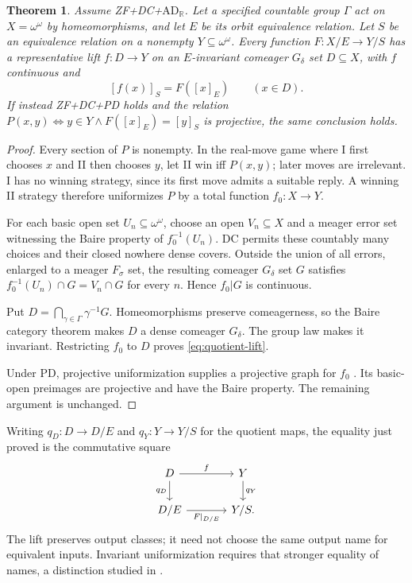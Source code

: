 \documentclass[11pt]{article}
\newtheorem{theorem}{Theorem}[section]
\theoremstyle{definition}
\newcommand{\B}{\omega^\omega}
\begin{document}
\begin{theorem}\label{thm:generic-lift}
Assume ZF+DC+$\mathrm{AD}_{\mathbb R}$. Let a specified countable
group $\Gamma$ act on $X=\B$ by homeomorphisms, and let $E$ be
its orbit equivalence relation. Let $S$ be an equivalence relation
on a nonempty $Y\subseteq\B$. Every function
$F:X/E\to Y/S$ has a representative lift
$f:D\to Y$ on an $E$-invariant comeager $G_\delta$ set
$D\subseteq X$, with $f$ continuous and
\begin{equation}\label{eq:quotient-lift}
 [f(x)]_S=F([x]_E)\qquad(x\in D).
\end{equation}
If instead ZF+DC+PD holds and the relation
$P(x,y)\iff y\in Y\land F([x]_E)=[y]_S$ is projective,
the same conclusion holds.
\end{theorem}
\begin{proof}
Every section of $P$ is nonempty. In the real-move game where I
first chooses $x$ and II then chooses $y$, let II win iff $P(x,y)$;
later moves are irrelevant. I has no winning strategy, since its
first move admits a suitable reply. A winning II strategy therefore
uniformizes $P$ by a total function $f_0:X\to Y$.

For each basic open set $U_n\subseteq\B$, choose an open
$V_n\subseteq X$ and a meager error set witnessing the Baire
property of $f_0^{-1}(U_n)$. DC permits these countably many
choices and their closed nowhere dense covers. Outside the union
of all errors, enlarged to a meager $F_\sigma$ set, the resulting
comeager $G_\delta$ set $G$ satisfies
$f_0^{-1}(U_n)\cap G=V_n\cap G$ for every $n$.
Hence $f_0|G$ is continuous.

Put $D=\bigcap_{\gamma\in\Gamma}\gamma^{-1}G$.
Homeomorphisms preserve comeagerness, so the Baire category theorem
makes $D$ a dense comeager $G_\delta$. The group law makes it
invariant. Restricting $f_0$ to $D$ proves \eqref{eq:quotient-lift}.

Under PD, projective uniformization supplies a projective graph for
$f_0$ \cite[Theorem 6C.5]{Moschovakis}. Its basic-open preimages
are projective and have the Baire property. The remaining argument
is unchanged.
\end{proof}

Writing $q_D:D\to D/E$ and $q_Y:Y\to Y/S$ for the quotient
maps, the equality just proved is the commutative square
\[
\begin{tikzcd}[column sep=large]
D\arrow[r,"f"]\arrow[d,"q_D"']&Y\arrow[d,"q_Y"]\\
D/E\arrow[r,"F|_{D/E}"']&Y/S.
\end{tikzcd}
\]
The lift preserves output classes; it need not choose the same
output name for equivalent inputs. Invariant uniformization requires
that stronger equality of names, a distinction studied in
\cite{KechrisWolman}.
\end{document}
